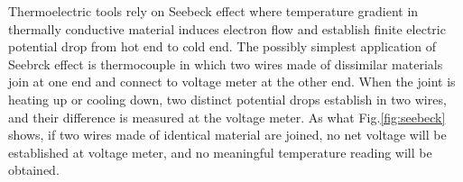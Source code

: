 Thermoelectric tools rely on Seebeck effect where temperature gradient in thermally conductive material induces electron flow and establish finite electric potential drop from hot end to cold end. The possibly simplest application of Seebrck effect is thermocouple in which two wires made of dissimilar materials join at one end and connect to voltage meter at the other end. When the joint is heating up or cooling down, two distinct potential drops establish in two wires, and their difference is measured at the voltage meter. As what Fig.\ref{fig:seebeck} shows, if two wires made of identical material are joined, no net voltage will be established at voltage meter, and no meaningful temperature reading will be obtained.
\begin{marginfigure}
	\begin{tikzpicture}[x=0.75pt,y=0.75pt,yscale=-0.8,xscale=0.6]
		

\end{tikzpicture}
\end{marginfigure}
